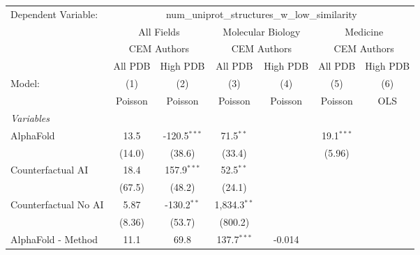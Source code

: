 \begingroup
\centering
\begin{tabular}{lcccccc}
   \tabularnewline \midrule \midrule
   Dependent Variable: & \multicolumn{6}{c}{num\_uniprot\_structures\_w\_low\_similarity}\\
 & \multicolumn{2}{c}{All Fields} & \multicolumn{2}{c}{Molecular Biology} & \multicolumn{2}{c}{Medicine} \\
\cmidrule(lr){2-3} \cmidrule(lr){4-5} \cmidrule(lr){6-7}
 & \multicolumn{2}{c}{CEM Authors} & \multicolumn{2}{c}{CEM Authors} & \multicolumn{2}{c}{CEM Authors} \\
\cmidrule(lr){2-3} \cmidrule(lr){4-5} \cmidrule(lr){6-7}
 & \multicolumn{1}{c}{All PDB} & \multicolumn{1}{c}{High PDB} & \multicolumn{1}{c}{All PDB} & \multicolumn{1}{c}{High PDB} & \multicolumn{1}{c}{All PDB} & \multicolumn{1}{c}{High PDB} \\
\cmidrule(lr){2-2} \cmidrule(lr){3-3} \cmidrule(lr){4-4} \cmidrule(lr){5-5} \cmidrule(lr){6-6} \cmidrule(lr){7-7}
   Model:                                                  & (1)      & (2)            & (3)            & (4)     & (5)          & (6)\\  
                                                           &  Poisson & Poisson        & Poisson        & Poisson & Poisson      & OLS\\  
   \midrule
   \emph{Variables}\\
   AlphaFold                                               & 13.5     & -120.5$^{***}$ & 71.5$^{**}$    &         & 19.1$^{***}$ &   \\   
                                                           & (14.0)   & (38.6)         & (33.4)         &         & (5.96)       &   \\   
   Counterfactual AI                                       & 18.4     & 157.9$^{***}$  & 52.5$^{**}$    &         &              &   \\   
                                                           & (67.5)   & (48.2)         & (24.1)         &         &              &   \\   
   Counterfactual No AI                                    & 5.87     & -130.2$^{**}$  & 1,834.3$^{**}$ &         &              &   \\   
                                                           & (8.36)   & (53.7)         & (800.2)        &         &              &   \\   
   AlphaFold - Method                                      & 11.1     & 69.8           & 137.7$^{***}$  & -0.014  &              &   \\   

\end{tabular}
